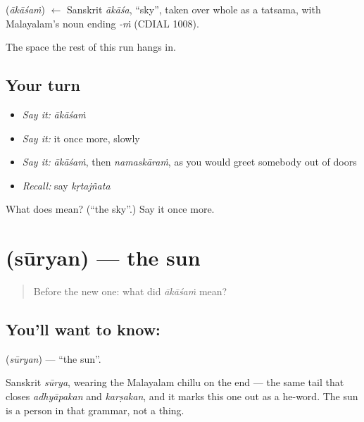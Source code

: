 \begin{cousinweb}
\textbf{} (\emph{ākāśaṁ}) $\leftarrow$ Sanskrit \emph{ākāśa}, \textquotedblleft{}sky\textquotedblright{}, taken over whole as a tatsama, with Malayalam's noun ending \emph{-ṁ} (CDIAL 1008).
\end{cousinweb}

\begin{grammarlens}[title={What you've built}]
The space the rest of this run hangs in.
\end{grammarlens}

\subsection*{Your turn}
\begin{itemize}
\raggedright
  \item \emph{Say it:} \emph{ākāśaṁ}
  \item \emph{Say it:} it once more, slowly
  \item \emph{Say it:} \emph{ākāśaṁ}, then \emph{namaskāraṁ}, as you would greet somebody out of doors
  \item \emph{Recall:} say \emph{kṛtajñata}
\end{itemize}

\begin{tcolorbox}[breakable,colback=teal!4,colframe=teal!35!black,title={Before you move on}]
What does  mean? (\textquotedblleft{}the sky\textquotedblright{}.) Say it once more.
\end{tcolorbox}
\section[\texorpdfstring{\ml{സൂര്യൻ} (sūryan)}{സൂര്യൻ (sūryan)}]{ (sūryan) — the sun}

\label{lesson:ML-C53-sun}



\begin{quote}
Before the new one: what did \emph{ākāśaṁ} mean?
\end{quote}

\subsection*{You'll want to know: }
\textbf{} (\emph{sūryan}) — \textquotedblleft{}the sun\textquotedblright{}.

Sanskrit \emph{sūrya}, wearing the Malayalam chillu  on the end — the same tail that closes \emph{adhyāpakan} and \emph{karṣakan}, and it marks this one out as a he-word. The sun is a person in that grammar, not a thing.

